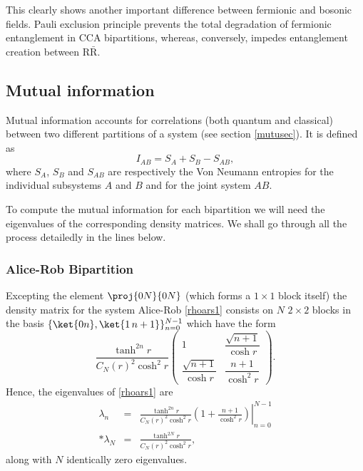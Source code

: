 This clearly shows another important difference between fermionic and bosonic fields. Pauli exclusion principle prevents the total degradation of fermionic  entanglement in CCA bipartitions, whereas, conversely, impedes entanglement creation between $\text{R}{\bar{\text{R}}}$.




\subsection{Mutual information}\label{mutualsec}

Mutual information accounts for correlations (both quantum and classical) between two different partitions of a system (see section \ref{mutusec}). It is defined as
\begin{equation}\label{mutualdef}
I_{AB}=S_A+S_B-S_{AB},
\end{equation}
where $S_A$, $S_B$ and $S_{AB}$ are respectively the Von Neumann entropies for the individual subsystems $A$ and $B$ and for the joint system $AB$.

To compute the mutual information  for each bipartition we will need the eigenvalues of the corresponding density matrices. We shall go through all the process detailedly in the lines below.

\subsubsection{Alice-Rob Bipartition}

Excepting the element $\proj{0N}{0N}$ (which forms a $1\times1$ block itself) the density matrix for the system Alice-Rob \eqref{rhoars1} consists on $N$ $2\times2$ blocks in the basis $\{\ket{0 n},\ket{1\, n+1}\}_{n=0}^{N-1}$ which have the form
\begin{equation}
\frac{\tanh^{2n}r}{C_N(r)^2\cosh^2r }
\left(\!\begin{array}{cc}
1 & \dfrac{\sqrt{n+1}}{\cosh r}\\
\dfrac{\sqrt{n+1}}{\cosh r} & \dfrac{n+1}{\cosh^2r}
\end{array}\!\right).
\end{equation}
Hence, the eigenvalues of \eqref{rhoars1} are
\begin{eqnarray}\label{eigAR}
\nonumber\lambda_n&=&\left.\frac{\tanh^{2n}r}{C_N(r)^2\cosh^2r}\left(1+\frac{n+1}{\cosh^2 r}\right)\right|_{n=0}^{N-1}\\*
\lambda_N&=&\frac{\tanh^{2N} r}{C_N(r)^2\cosh^2r},
\end{eqnarray}
along with $N$ identically zero eigenvalues.

